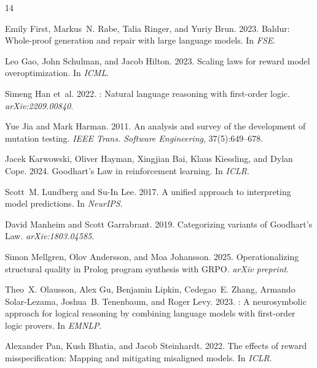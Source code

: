 \documentclass[11pt,a4paper]{article}
\begin{document}
\begin{thebibliography}{14}
\providecommand{\natexlab}[1]{#1}

Emily First, Markus~N. Rabe, Talia Ringer, and Yuriy Brun. 2023.
\newblock Baldur: Whole-proof generation and repair with large language models.
\newblock In \emph{FSE}.

Leo Gao, John Schulman, and Jacob Hilton. 2023.
\newblock Scaling laws for reward model overoptimization.
\newblock In \emph{ICML}.

Simeng Han et~al. 2022.
: Natural language reasoning with first-order logic.
\newblock \emph{arXiv:2209.00840}.

Yue Jia and Mark Harman. 2011.
\newblock An analysis and survey of the development of mutation testing.
\newblock \emph{IEEE Trans. Software Engineering}, 37(5):649--678.

Jacek Karwowski, Oliver Hayman, Xingjian Bai, Klaus Kiessling, and Dylan Cope. 2024.
\newblock Goodhart's Law in reinforcement learning.
\newblock In \emph{ICLR}.

Scott~M. Lundberg and Su-In Lee. 2017.
\newblock A unified approach to interpreting model predictions.
\newblock In \emph{NeurIPS}.

David Manheim and Scott Garrabrant. 2019.
\newblock Categorizing variants of Goodhart's Law.
\newblock \emph{arXiv:1803.04585}.

Simon Mellgren, Olov Andersson, and Moa Johansson. 2025.
\newblock Operationalizing structural quality in Prolog program synthesis with GRPO.
\newblock \emph{arXiv preprint}.

Theo~X. Olausson, Alex Gu, Benjamin Lipkin, Cedegao~E. Zhang, Armando Solar-Lezama, Joshua~B. Tenenbaum, and Roger Levy. 2023.
: A neurosymbolic approach for logical reasoning by combining language models with first-order logic provers.
\newblock In \emph{EMNLP}.

Alexander Pan, Kush Bhatia, and Jacob Steinhardt. 2022.
\newblock The effects of reward misspecification: Mapping and mitigating misaligned models.
\newblock In \emph{ICLR}.


\end{thebibliography}
\end{document}
